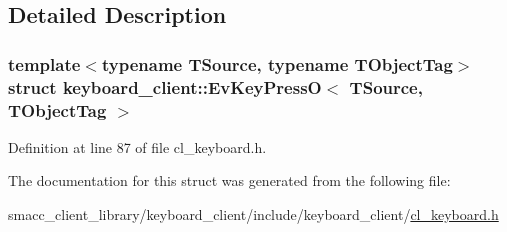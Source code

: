 \subsection{Detailed Description}
\subsubsection*{template$<$typename T\+Source, typename T\+Object\+Tag$>$\newline
struct keyboard\+\_\+client\+::\+Ev\+Key\+Press\+O$<$ T\+Source, T\+Object\+Tag $>$}



Definition at line 87 of file cl\+\_\+keyboard.\+h.



The documentation for this struct was generated from the following file\+:\begin{DoxyCompactItemize}
\item 
smacc\+\_\+client\+\_\+library/keyboard\+\_\+client/include/keyboard\+\_\+client/\hyperlink{cl__keyboard_8h}{cl\+\_\+keyboard.\+h}\end{DoxyCompactItemize}
